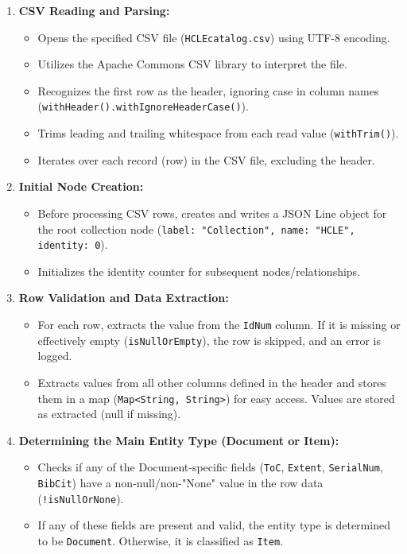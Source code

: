 \begin{enumerate}
    \item \textbf{CSV Reading and Parsing:}
        \begin{itemize}
            \item Opens the specified CSV file (\texttt{HCLEcatalog.csv}) using UTF-8 encoding.
            \item Utilizes the Apache Commons CSV library to interpret the file.
            \item Recognizes the first row as the header, ignoring case in column names \\
            (\texttt{withHeader().withIgnoreHeaderCase()}).
            \item Trims leading and trailing whitespace from each read value (\texttt{withTrim()}).
            \item Iterates over each record (row) in the CSV file, excluding the header.
        \end{itemize}

    \item \textbf{Initial Node Creation:}
        \begin{itemize}
            \item Before processing CSV rows, creates and writes a JSON Line object for the root collection node (\texttt{label: "Collection", name: "HCLE", identity: 0}).
            \item Initializes the identity counter for subsequent nodes/relationships.
        \end{itemize}

    \item \textbf{Row Validation and Data Extraction:}
        \begin{itemize}
            \item For each row, extracts the value from the \texttt{IdNum} column. If it is missing or effectively empty (\texttt{isNullOrEmpty}), the row is skipped, and an error is logged.
            \item Extracts values from all other columns defined in the header and stores them in a map (\texttt{Map<String, String>}) for easy access. Values are stored as extracted (null if missing).
        \end{itemize}

    \item \textbf{Determining the Main Entity Type (Document or Item):}
        \begin{itemize}
           \item Checks if any of the Document-specific fields (\texttt{ToC}, \texttt{Extent}, \texttt{SerialNum}, \texttt{BibCit}) have a non-null/non-"None" value in the row data (\texttt{!isNullOrNone}).
            \item If any of these fields are present and valid, the entity type is determined to be \texttt{Document}. Otherwise, it is classified as \texttt{Item}.
        \end{itemize}


\end{enumerate}
